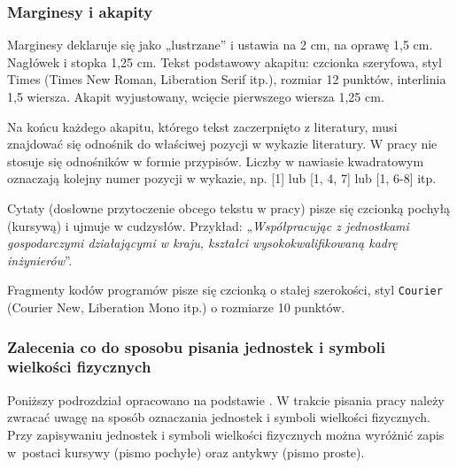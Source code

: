 \documentclass[12pt,twoside]{article}
\begin{document}
\subsubsection{Marginesy i akapity}

Marginesy deklaruje się jako „lustrzane” i ustawia na 2 cm, na oprawę 1,5 cm. 
Nagłówek i stopka 1,25 cm. Tekst podstawowy akapitu: czcionka szeryfowa, styl Times (Times New Roman, Liberation Serif itp.), rozmiar 12 punktów, interlinia 1,5 wiersza. Akapit wyjustowany, wcięcie pierwszego wiersza 1,25 cm. 

Na końcu każdego akapitu, którego tekst zaczerpnięto z literatury, musi znajdować się odnośnik do właściwej pozycji w wykazie literatury. W pracy nie stosuje się
odnośników w formie przypisów. Liczby w nawiasie kwadratowym oznaczają kolejny numer pozycji w wykazie, np. [1] lub [1, 4, 7] lub [1, 6-8] itp.

Cytaty (dosłowne przytoczenie obcego tekstu w pracy) pisze się czcionką pochyłą (kursywą) i ujmuje w cudzysłów. Przykład: „\textit{Współpracując z jednostkami gospodarczymi działającymi w kraju, kształci wysokokwalifikowaną kadrę inżynierów}”.

Fragmenty kodów programów pisze się czcionką o stałej szerokości, styl \footnotesize {\texttt{Courier}}
\normalsize{(Courier New, Liberation Mono itp.) o rozmiarze 10 punktów.}


\subsubsection{Zalecenia co do sposobu pisania jednostek i symboli wielkości fizycznych}

Poniższy podrozdział opracowano na podstawie \cite{Pawluk2001}. W trakcie pisania pracy należy zwracać uwagę na sposób oznaczania jednostek i symboli wielkości fizycznych. Przy zapisywaniu jednostek i symboli wielkości fizycznych można wyróżnić zapis w~postaci kursywy (pismo pochyłe) oraz antykwy (pismo proste). 
\end{document}
